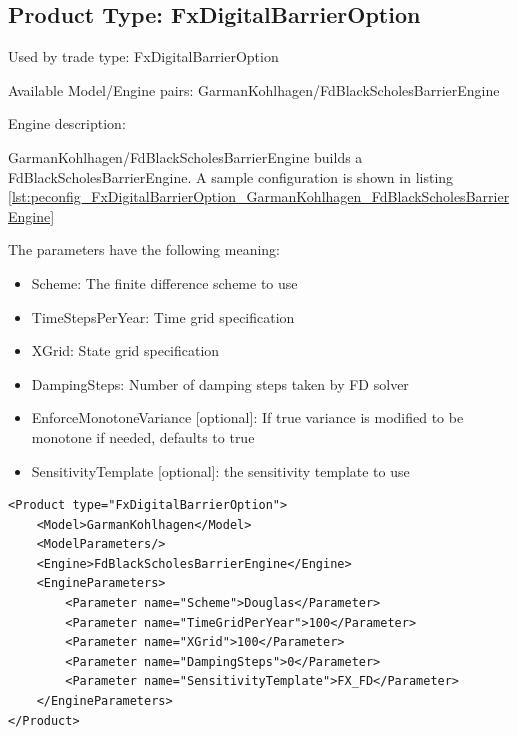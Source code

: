\subsection{Product Type: FxDigitalBarrierOption}

Used by trade type: FxDigitalBarrierOption

Available Model/Engine pairs: GarmanKohlhagen/FdBlackScholesBarrierEngine

Engine description:

GarmanKohlhagen/FdBlackScholesBarrierEngine builds a FdBlackScholesBarrierEngine. A sample configuration is shown in
listing \ref{lst:peconfig_FxDigitalBarrierOption_GarmanKohlhagen_FdBlackScholesBarrierEngine}

The parameters have the following meaning:

\begin{itemize}
\item Scheme: The finite difference scheme to use
\item TimeStepsPerYear: Time grid specification
\item XGrid: State grid specification
\item DampingSteps: Number of damping steps taken by FD solver
\item EnforceMonotoneVariance [optional]: If true variance is modified to be monotone if needed, defaults to true
\item SensitivityTemplate [optional]: the sensitivity template to use
\end{itemize}

\begin{longlisting}
\begin{verbatim}
<Product type="FxDigitalBarrierOption">
    <Model>GarmanKohlhagen</Model>
    <ModelParameters/>
    <Engine>FdBlackScholesBarrierEngine</Engine>
    <EngineParameters>
        <Parameter name="Scheme">Douglas</Parameter>
        <Parameter name="TimeGridPerYear">100</Parameter>
        <Parameter name="XGrid">100</Parameter>
        <Parameter name="DampingSteps">0</Parameter>
        <Parameter name="SensitivityTemplate">FX_FD</Parameter>
    </EngineParameters>
</Product>
\end{verbatim}
\caption{Configuration for Product FxDigitalBarrierOption, Model GarmanKohlhagen, Engine FdBlackScholesBarrierEngine}
\label{lst:peconfig_FxDigitalBarrierOption_GarmanKohlhagen_FdBlackScholesBarrierEngine}
\end{longlisting}

